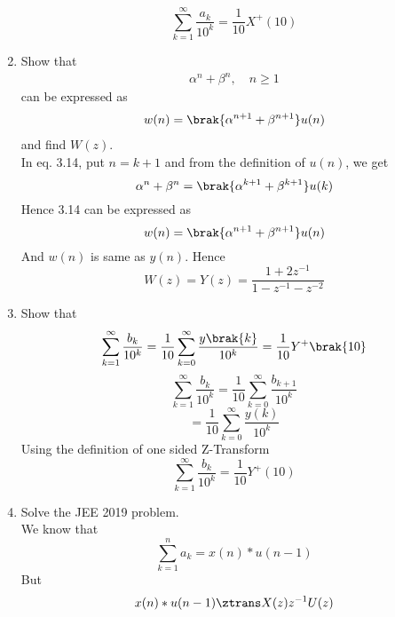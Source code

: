 \documentclass[journal,12pt,twocolumn]{IEEEtran}
\renewcommand\thesection{\arabic{section}}
\begin{document}
\begin{enumerate}[label=\thesection.\arabic*,ref=\thesection.\theenumi]
\begin{equation}
	\boxed{\sum_{k=1}^{\infty}\frac{a_k}{10^{k}} = \frac{1}{10}X^{+}(10)}
\end{equation}
 \item Show that 
\begin{align}
	\alpha^n + \beta^n, \quad n \ge 1
\end{align}
can be expressed as 
\begin{align}
	w(n) =\brak{\alpha^{n+1} + \beta^{n+1}}u(n)
\end{align}
		and find $W(z)$. \\
\solution
In eq. 3.14, put $n = k + 1$ and from the definition of $u(n)$, we get
\begin{equation}
	\alpha^{n} + \beta^{n} = \brak{{\alpha}^{k + 1} + {\beta}^{k + 1}}u(k)
\end{equation}
Hence 3.14 can be expressed as
\begin{equation}
	w(n) = \brak{\alpha^{n + 1} + \beta^{n + 1}}u(n)
\end{equation}
And $w(n)$ is same as $y(n)$. Hence
\begin{equation}
	\boxed{W(z) = Y(z) = \frac{1 + 2z^{-1}}{1 - z^{-1} - z^{-2}}}
\end{equation}
 \item Show that 
\begin{align}
	\sum_{k=1}^{\infty}\frac{b_k}{10^k} =
	\frac{1}{10}\sum_{k=0}^{\infty}\frac{y\brak{k}}{10^k} =\frac{1}{10}Y^{+}\brak{{10}}
\end{align}
\solution
\begin{equation}
	\sum_{k=1}^{\infty}\frac{b_k}{10^{k}} = \frac{1}{10}\sum_{k=0}^{\infty}\frac{b_{k+1}}{10^{k}}
\end{equation}
\begin{equation}
	= \frac{1}{10}\sum_{k=0}^{\infty}\frac{y(k)}{10^{k}}
\end{equation}
Using the definition of one sided Z-Transform
\begin{equation}
	\boxed{\sum_{k=1}^{\infty}\frac{b_k}{10^{k}} = \frac{1}{10}Y^{+}(10)}
\end{equation}
\item Solve the JEE 2019 problem. \\
\solution
We know that
\begin{equation}
	\sum_{k=1}^{n}a_k = x(n)\ast u(n - 1)
\end{equation}
But
\begin{equation}
	x(n)\ast u(n - 1)\ztrans X(z)z^{-1}U(z)
\end{equation}

\end{enumerate}
\end{document}
